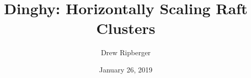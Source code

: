 \documentclass[11pt, twocolumn]{article}
\title{Dinghy: Horizontally Scaling Raft Clusters}
\author{Drew Ripberger}
\date{January 26, 2019}
\begin{document}
  \maketitle
  \textbf{}
  
  
  
  
  
  
  
\end{document}

